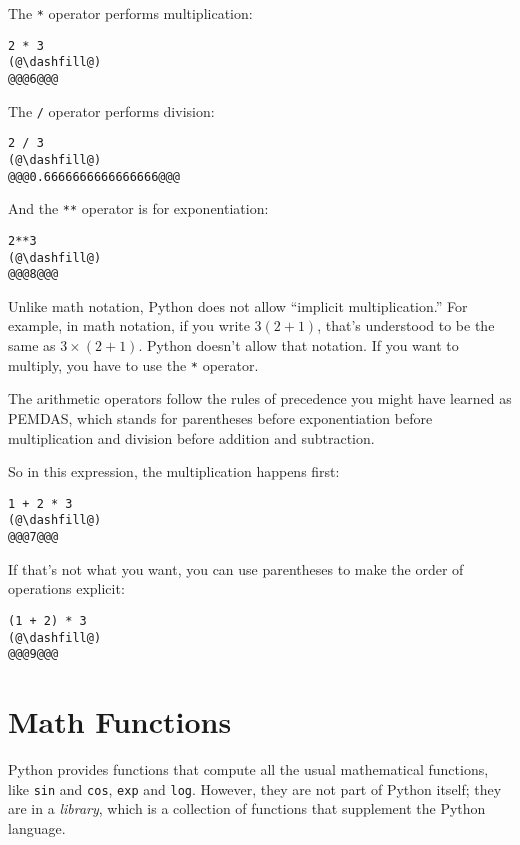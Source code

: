 The \passthrough{\lstinline!*!} operator performs multiplication: 

\begin{lstlisting}[]
2 * 3
(@\dashfill@)
@@@6@@@
\end{lstlisting}
The \passthrough{\lstinline!/!} operator performs division:
\begin{lstlisting}[]
2 / 3
(@\dashfill@)
@@@0.6666666666666666@@@
\end{lstlisting}
And the \passthrough{\lstinline!**!} operator is for exponentiation:

\begin{lstlisting}[]
2**3
(@\dashfill@)
@@@8@@@
\end{lstlisting}

Unlike math notation, Python does not allow ``implicit multiplication.''
For example, in math notation, if you write \(3 (2 + 1)\), that's
understood to be the same as \(3 \times (2+ 1)\). Python doesn't allow
that notation. If you want to multiply, you have to use the
\passthrough{\lstinline!*!} operator.

The arithmetic operators follow the rules of precedence you might have
learned as PEMDAS, which stands for parentheses before exponentiation before multiplication and division before addition and subtraction.

So in this expression, the multiplication happens first:

\begin{lstlisting}[]
1 + 2 * 3
(@\dashfill@)
@@@7@@@
\end{lstlisting}

If that's not what you want, you can
use parentheses to make the order of operations explicit:

\begin{lstlisting}[]
(1 + 2) * 3
(@\dashfill@)
@@@9@@@
\end{lstlisting}

\hypertarget{math-functions}{%
\section{Math Functions}\label{math-functions}}

Python provides functions that compute all the usual mathematical
functions, like \passthrough{\lstinline!sin!} and
\passthrough{\lstinline!cos!}, \passthrough{\lstinline!exp!} and
\passthrough{\lstinline!log!}. However, they are not part of Python
itself; they are in a \emph{library}, which is a collection of
functions that supplement the Python language.

